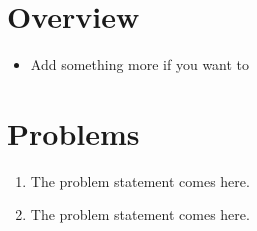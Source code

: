 \documentclass{Contingent}
\begin{document}
\maketitlepage

\section{Overview}
\printtopicsandauthors
\begin{itemize}
    \item Add something more if you want to
\end{itemize}

\section{Problems}
\begin{enumerate}
    \item \begin{problem}
    The problem statement comes here.
    \end{problem}
    
    \item \begin{problem}[Problem 2]
    The problem statement comes here.
    \end{problem}
\end{enumerate}
\end{document}
